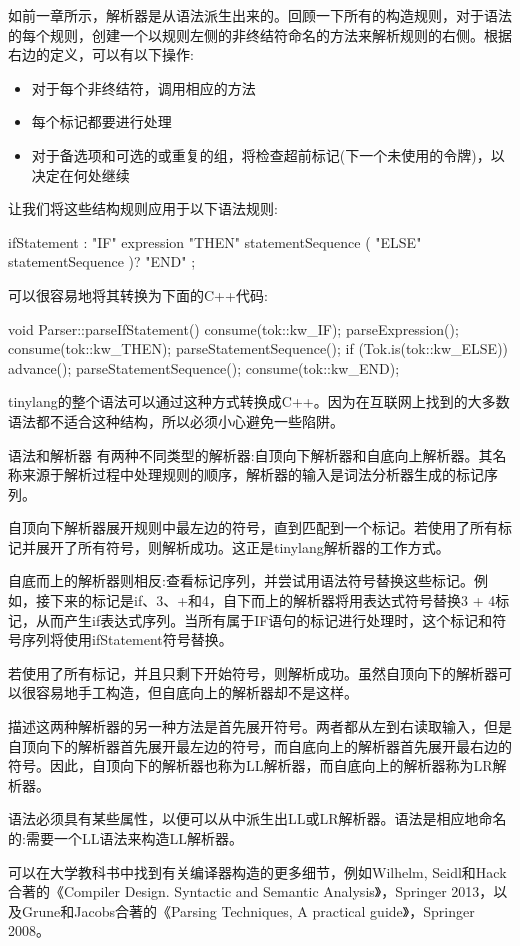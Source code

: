如前一章所示，解析器是从语法派生出来的。回顾一下所有的构造规则，对于语法的每个规则，创建一个以规则左侧的非终结符命名的方法来解析规则的右侧。根据右边的定义，可以有以下操作:

\begin{itemize}
\item
对于每个非终结符，调用相应的方法

\item
每个标记都要进行处理

\item
对于备选项和可选的或重复的组，将检查超前标记(下一个未使用的令牌)，以决定在何处继续
\end{itemize}

让我们将这些结构规则应用于以下语法规则:

\begin{shell}
ifStatement
    : "IF" expression "THEN" statementSequence
        ( "ELSE" statementSequence )? "END" ;
\end{shell}

可以很容易地将其转换为下面的C++代码:

\begin{cpp}
void Parser::parseIfStatement() {
    consume(tok::kw_IF);
    parseExpression();
    consume(tok::kw_THEN);
    parseStatementSequence();
    if (Tok.is(tok::kw_ELSE)) {
        advance();
        parseStatementSequence();
    }
    consume(tok::kw_END);
}
\end{cpp}

tinylang的整个语法可以通过这种方式转换成C++。因为在互联网上找到的大多数语法都不适合这种结构，所以必须小心避免一些陷阱。

\begin{myTip}{语法和解析器}
有两种不同类型的解析器:自顶向下解析器和自底向上解析器。其名称来源于解析过程中处理规则的顺序，解析器的输入是词法分析器生成的标记序列。

自顶向下解析器展开规则中最左边的符号，直到匹配到一个标记。若使用了所有标记并展开了所有符号，则解析成功。这正是tinylang解析器的工作方式。

自底而上的解析器则相反:查看标记序列，并尝试用语法符号替换这些标记。例如，接下来的标记是if、3、+和4，自下而上的解析器将用表达式符号替换3 + 4标记，从而产生if表达式序列。当所有属于IF语句的标记进行处理时，这个标记和符号序列将使用ifStatement符号替换。

若使用了所有标记，并且只剩下开始符号，则解析成功。虽然自顶向下的解析器可以很容易地手工构造，但自底向上的解析器却不是这样。

描述这两种解析器的另一种方法是首先展开符号。两者都从左到右读取输入，但是自顶向下的解析器首先展开最左边的符号，而自底向上的解析器首先展开最右边的符号。因此，自顶向下的解析器也称为LL解析器，而自底向上的解析器称为LR解析器。

语法必须具有某些属性，以便可以从中派生出LL或LR解析器。语法是相应地命名的:需要一个LL语法来构造LL解析器。

可以在大学教科书中找到有关编译器构造的更多细节，例如Wilhelm, Seidl和Hack合著的《Compiler Design. Syntactic and Semantic Analysis》，Springer 2013，以及Grune和Jacobs合著的《Parsing Techniques, A practical guide》，Springer 2008。
\end{myTip}

